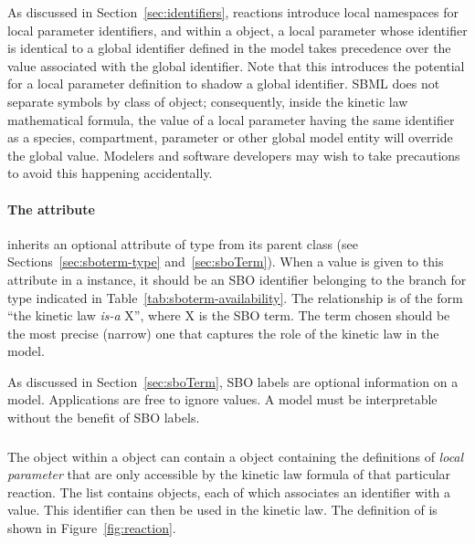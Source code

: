 As discussed in Section~\ref{sec:identifiers}, reactions introduce
local namespaces for local parameter identifiers, and within a
\KineticLaw object, a local parameter whose identifier is
identical to a global identifier defined in the model takes
precedence over the value associated with the global identifier.
Note that this introduces the potential for a local parameter
definition to shadow a global identifier.  SBML does not separate
symbols by class of object; consequently, inside the kinetic law
mathematical formula, the value of a local parameter having the
same identifier as a species, compartment, parameter or other
global model entity will override the global value.  Modelers and
software developers may wish to take precautions to avoid this
happening accidentally.


\paragraph{The  attribute}

\KineticLaw  inherits an optional 
attribute of type  from its parent
class \SBase (see Sections~\ref{sec:sboterm-type}
and~\ref{sec:sboTerm}).  When a value is given to this
attribute in a  \KineticLaw instance, it should be an
SBO identifier belonging to the branch for type  \KineticLaw
indicated in Table~\ref{tab:sboterm-availability}.  The relationship is
of the form ``the kinetic law \emph{is-a} X'', where X is
the SBO term.  The term chosen should be the most precise (narrow)
one that captures the role of the kinetic law in the model.

As discussed in Section~\ref{sec:sboTerm}, SBO labels are optional
information on a model.  Applications are free to ignore
 values.  A model must be interpretable without the
benefit of SBO labels.


\subsubsection{}
\label{subsec:localparameter}

The \KineticLaw object within a \Reaction object can contain a
\ListOfLocalParameters object containing the definitions of
\emph{local parameter} that are only accessible by the kinetic law
formula of that particular reaction.  The list contains
\LocalParameter objects, each of which associates an identifier
with a value.  This identifier can then be used in the kinetic
law.  The definition of \LocalParameter is shown in
Figure~\vref{fig:reaction}.


